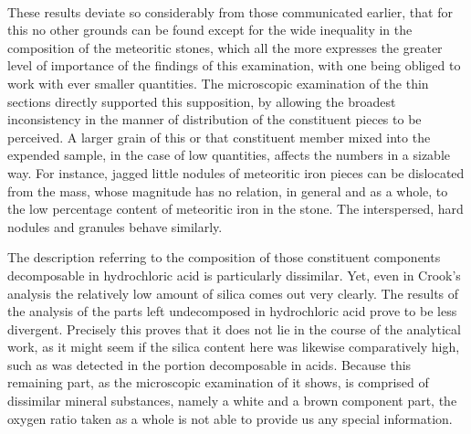 \documentclass[a4paper, 12pt, oneside]{article}
\begin{document}
\paragraph*{}
These results deviate so considerably from those communicated earlier, that for this no other grounds can be found except for the wide inequality in the composition of the meteoritic stones, which all the more expresses the greater level of importance of the findings of this examination, with one being obliged to work with ever smaller quantities. The microscopic examination of the thin sections directly supported this supposition, by allowing the broadest inconsistency in the manner of distribution of the constituent pieces to be perceived. A larger grain of this or that constituent member mixed into the expended sample, in the case of low quantities, affects the numbers in a sizable way. For instance, jagged little nodules of meteoritic iron pieces can be dislocated from the mass, whose magnitude has no relation, in general and as a whole, to the low percentage content of meteoritic iron in the stone. The interspersed, hard nodules and granules behave similarly.

The description referring to the composition of those constituent components decomposable in hydrochloric acid is particularly dissimilar. Yet, even in Crook's analysis the relatively low amount of silica comes out very clearly. The results of the analysis of the parts left undecomposed in hydrochloric acid prove to be less divergent. Precisely this proves that it does not lie in the course of the analytical work, as it might seem if the silica content here was likewise comparatively high, such as was detected in the portion decomposable in acids. Because this remaining part, as the microscopic examination of it shows, is comprised of dissimilar mineral substances, namely a white and a brown component part, the oxygen ratio taken as a whole is not able to provide us any special information.
\end{document}
